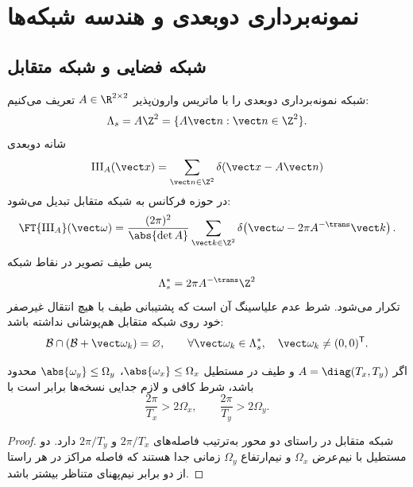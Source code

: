 \section{نمونه‌برداری دوبعدی و هندسه شبکه‌ها}

\subsection{شبکه فضایی و شبکه متقابل}

شبکه نمونه‌برداری دوبعدی را با ماتریس وارون‌پذیر \(A\in\R^{2\times2}\) تعریف می‌کنیم:
\begin{equation}
\Lambda_s=A\Z^2=\{A\vect n:\vect n\in\Z^2\}.
\end{equation}
شانه دوبعدی
\begin{equation}
\operatorname{III}_{A}(\vect x)=\sum_{\vect n\in\Z^2}
\delta(\vect x-A\vect n)
\end{equation}
در حوزه فرکانس به شبکه متقابل تبدیل می‌شود:
\begin{equation}
\FT\{\operatorname{III}_A\}(\vect\omega)
=\frac{(2\pi)^2}{\abs{\det A}}
\sum_{\vect k\in\Z^2}
\delta\!\left(\vect\omega-2\pi A^{-\trans}\vect k\right).
\label{eq:reciprocal-lattice}
\end{equation}
پس طیف تصویر در نقاط شبکه
\begin{equation}
\Lambda_s^*=2\pi A^{-\trans}\Z^2
\end{equation}
تکرار می‌شود. شرط عدم علیاسینگ آن است که پشتیبانی طیف با هیچ انتقال غیرصفر خود روی شبکه
متقابل هم‌پوشانی نداشته باشد:
\begin{equation}
\mathcal B\cap(\mathcal B+\vect\omega_k)=\varnothing,
\qquad \forall \vect\omega_k\in\Lambda_s^*,\quad \vect\omega_k\ne(0,0)^{\mathsf T}.
\label{eq:2d-no-overlap}
\end{equation}

\begin{proposition}
اگر \(A=\diag(T_x,T_y)\) و طیف در مستطیل
\(\abs{\omega_x}\le\Omega_x\)، \(\abs{\omega_y}\le\Omega_y\) محدود باشد،
شرط کافی و لازم جدایی نسخه‌ها برابر است با
\begin{equation}
\frac{2\pi}{T_x}>2\Omega_x,
\qquad
\frac{2\pi}{T_y}>2\Omega_y.
\end{equation}
\end{proposition}

\begin{proof}
شبکه متقابل در راستای دو محور به‌ترتیب فاصله‌های \(2\pi/T_x\) و \(2\pi/T_y\) دارد.
دو مستطیل با نیم‌عرض \(\Omega_x\) و نیم‌ارتفاع \(\Omega_y\) زمانی جدا هستند که فاصله مراکز
در هر راستا از دو برابر نیم‌پهنای متناظر بیشتر باشد.
\end{proof}

